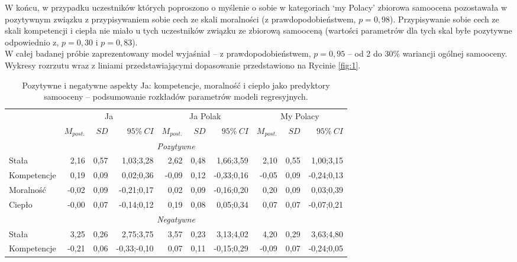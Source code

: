 \documentclass[man]{apa6}
\begin{document}
W końcu, w przypadku uczestników których poproszono o myślenie o sobie w kategoriach `my Polacy' zbiorowa samoocena pozostawała w pozytywnym związku z przypisywaniem sobie cech ze skali moralności (z prawdopodobieństwem, $p = 0,98$). Przypisywanie sobie cech ze skali kompetencji i ciepła nie miało u tych uczestników związku ze zbiorową samooceną (wartości parametrów dla tych skal byłe pozytywne odpowiednio z, $p = 0,30$ i $p = 0,83$).\\

W całej badanej próbie zaprezentowany model wyjaśniał -- z prawdopodobieństwem, $p = 0,95$ -- od 2 do 30\% wariancji ogólnej samooceny. Wykresy rozrzutu wraz z liniami przedstawiającymi dopasowanie przedstawiono na Rycinie \ref{fig:1}.\\

\begin{table*}[htbp]
\vspace*{2em}
\centering
\begin{threeparttable}
\caption{Pozytywne i negatywne aspekty Ja: kompetencje, moralność i ciepło jako predyktory samooceny -- podsumowanie rozkładów parametrów modeli regresyjnych.}
\label{tab:1}
\bgroup
\def\tabcolsep{4pt}
\begin{tabular}{lrrrrrrrrr}
\midrule
 &
\multicolumn{3}{c}{Ja} &
\multicolumn{3}{c}{Ja Polak} &
\multicolumn{3}{c}{My Polacy} \\
\cline{2-10}
 & $M_{post.}$    & $SD$   & $95\%\ CI$   & $M_{post.}$    & $SD$   & $95\%\ CI$   & $M_{post.}$    & $SD$   & $95\%\ CI$   \\
\midrule
 \multicolumn{10}{c}{\emph{Pozytywne}}  \\
 Stała       &  2,16 & 0,57 &  1,03;3,28 &  2,62 & 0,48 &  1,66;3,59 &  2,10 & 0,55 &  1,00;3,15 \\
 Kompetencje &  0,19 & 0,09 &  0,02;0,36 & -0,09 & 0,12 & -0,33;0,16 & -0,05 & 0,09 & -0,24;0,13 \\
 Moralność   & -0,02 & 0,09 & -0,21;0,17 &  0,02 & 0,09 & -0,16;0,20 &  0,20 & 0,09 &  0,03;0,39 \\
 Ciepło      & -0,00 & 0,07 & -0,14;0,12 &  0,19 & 0,08 &  0,05;0,34 &  0,07 & 0,07 & -0,07;0,21 \\
 \multicolumn{10}{c}{\emph{Negatywne}}  \\
 Stała       &  3,25 & 0,26 &  2,75;3,75 &  3,57 & 0,23 &  3,13;4,02 &  4,20  & 0,29 & 3,63;4,80 \\
 Kompetencje & -0,21 & 0,06 & -0,33;-0,10 &  0,07 & 0,11 & -0,15;0,29 & -0,09 & 0,07 & -0,24;0,05 \\

\end{tabular}
\end{threeparttable}
\end{table*}
\end{document}
